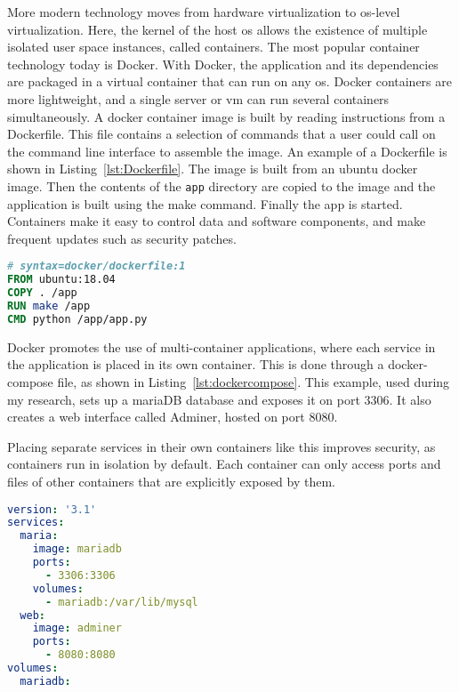 More modern technology moves from hardware virtualization to \gls{os}-level virtualization.
Here, the kernel of the host \gls{os} allows the existence of multiple isolated user space instances, called containers.
The most popular container technology today is Docker.
With Docker, the application and its dependencies are packaged in a virtual container that can run on any \gls{os}.
Docker containers are more lightweight, and a single server or \gls{vm} can run several containers simultaneously.
A docker container image is built by reading instructions from a Dockerfile.
This file contains a selection of commands that a user could call on the command line interface to assemble the image.
An example of a Dockerfile is shown in Listing~\ref{lst:Dockerfile}.
The image is built from an ubuntu docker image. Then the contents of the \texttt{app} directory are copied to the image and the application is built using the make command. Finally the app is started.
Containers make it easy to control data and software components, and make frequent updates such as security patches.

\begin{lstlisting}[language={Dockerfile},caption={Example of a Dockerfile to build and run a Python application.},label={lst:Dockerfile},xleftmargin=15pt,float]
# syntax=docker/dockerfile:1
FROM ubuntu:18.04
COPY . /app
RUN make /app
CMD python /app/app.py
\end{lstlisting}

Docker promotes the use of multi-container applications, where each service in the application is placed in its own container.
This is done through a docker-compose file, as shown in Listing~\ref{lst:dockercompose}.
This example, used during my research, sets up a mariaDB database and exposes it on port 3306. It also creates a web interface called Adminer, hosted on port 8080.

Placing separate services in their own containers like this improves security, as containers run in isolation by default.
Each container can only access ports and files of other containers that are explicitly exposed by them.

\begin{lstlisting}[language={YAML},caption={Example of a Dockerfile to build and run a Python application.},label={lst:dockercompose},xleftmargin=15pt,float]
version: '3.1'
services:
  maria:
    image: mariadb
    ports:
      - 3306:3306
    volumes:
      - mariadb:/var/lib/mysql
  web:
    image: adminer
    ports:
      - 8080:8080
volumes:
  mariadb:

\end{lstlisting}

